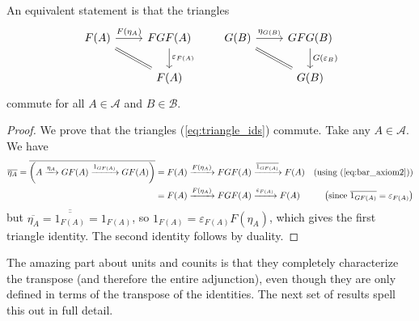 \documentclass[10pt,oneside]{book}
\def\~#1{\mathscr{#1}}
\def\To#1{\xrightarrow{#1}}
\newcommand{\ve}{\varepsilon}
\theoremstyle{plain}
\theoremstyle{definition}
\theoremstyle{remark}
\newtheorem*{warn}{Warning}
\numberwithin{equation}{section}
\numberwithin{figure}{section}
\begin{document}
An equivalent statement is that the triangles 
\begin{equation}
\label{eq:triangle_ids}
\begin{tikzcd}
    F(A) & FGF(A) \\
    & F(A)
    \arrow["{F(\eta_A)}", from=1-1, to=1-2]
    \arrow[Rightarrow, no head, from=1-1, to=2-2]
    \arrow["\ve_{F(A)}", from=1-2, to=2-2]
\end{tikzcd} \qquad \begin{tikzcd}
    G(B) & GFG(B) \\
    & G(B)
    \arrow["{\eta_{G(B)}}", from=1-1, to=1-2]
    \arrow[Rightarrow, no head, from=1-1, to=2-2]
    \arrow["{G(\ve_B)}", from=1-2, to=2-2]
\end{tikzcd} \end{equation}
commute for all $A \in \~A$ and $B \in \~B$. 


\begin{proof}
    We prove that the triangles (\ref{eq:triangle_ids}) commute. Take any $A \in \~A$. We have
    \begin{align*}
        \overline{\eta_A} = \overline{\left(A \To{\eta_A} GF(A) \To{1_{GF(A)}} GF(A)\right)} &= F(A) \To{F(\eta_A)} FGF(A) \To{\overline{1_{GF(A)}}} F(A) & \left(\text{using (\ref{eq:bar_axiom2})} \right) \\
        &= F(A) \To{F(\eta_A)} FGF(A) \To{\ve_{F(A)}} F(A) &\left(\text{since } \overline{1_{GF(A)}} = \ve_{F(A)} \right)
    \end{align*}
    but $\overline{\eta_A} = \overline{\overline{1_{F(A)}}} = 1_{F(A)}$, so $1_{F(A)} = \ve_{F(A)} F(\eta_A) $, which gives the first triangle identity. The second identity follows by duality.
\end{proof}

The amazing part about units and counits is that they completely characterize the transpose (and therefore the entire adjunction), even though they are only defined in terms of the transpose of the identities. The next set of results spell this out in full detail.
\end{document}
